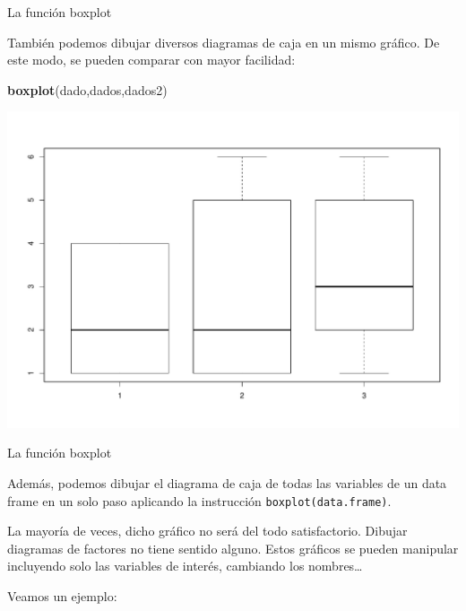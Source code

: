 \documentclass[
  ignorenonframetext,
]{beamer}
\newenvironment{Shaded}{\begin{snugshade}}{\end{snugshade}}
\newcommand{\KeywordTok}[1]{\textcolor[rgb]{0.13,0.29,0.53}{\textbf{#1}}}
\newcommand{\NormalTok}[1]{#1}
\begin{document}
\begin{frame}[fragile]{La función boxplot}
\protect\hypertarget{la-funciuxf3n-boxplot-1}{}

También podemos dibujar diversos diagramas de caja en un mismo gráfico.
De este modo, se pueden comparar con mayor facilidad:

\begin{Shaded}
\begin{Highlighting}[]
\KeywordTok{boxplot}\NormalTok{(dado,dados,dados2)}
\end{Highlighting}
\end{Shaded}

\includegraphics{Tema8.-Datos-Cuantitativos_files/figure-beamer/unnamed-chunk-26-1.pdf}

\end{frame}

\begin{frame}[fragile]{La función boxplot}
\protect\hypertarget{la-funciuxf3n-boxplot-2}{}

Además, podemos dibujar el diagrama de caja de todas las variables de un
data frame en un solo paso aplicando la instrucción
\texttt{boxplot(data.frame)}.

La mayoría de veces, dicho gráfico no será del todo satisfactorio.
Dibujar diagramas de factores no tiene sentido alguno. Estos gráficos se
pueden manipular incluyendo solo las variables de interés, cambiando los
nombres\ldots{}

Veamos un ejemplo:

\end{frame}
\end{document}
